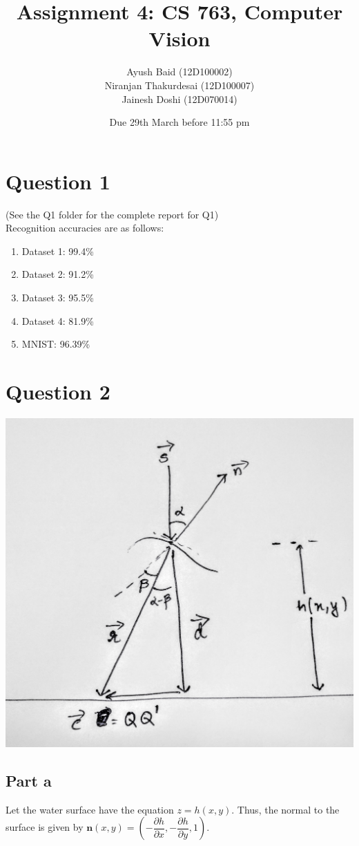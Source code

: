 \documentclass[11pt]{article}
\title{Assignment 4: CS 763, Computer Vision}
\author{Ayush Baid (12D100002) \\
Niranjan Thakurdesai (12D100007) \\
Jainesh Doshi (12D070014)}
\date{Due 29th March before 11:55 pm}
\begin{document}
\maketitle

\section*{Question 1}

(See the Q1 folder for the complete report for Q1) \\
Recognition accuracies are as follows:
\begin{enumerate}
\item Dataset 1: 99.4\%
\item Dataset 2: 91.2\%
\item Dataset 3: 95.5\%
\item Dataset 4: 81.9\%
\item MNIST: 96.39\%
\end{enumerate}

\section*{Question 2}

\includegraphics[scale=0.1]{diagram.jpg}

\subsection*{Part a}
Let the water surface have the equation $z = h(x,y)$. Thus, the normal to the surface is given by $\mathbf{n}(x,y) = \left( -\dfrac{\partial h}{\partial x},-\dfrac{\partial h}{\partial y},1 \right)$.\\
\end{document}
